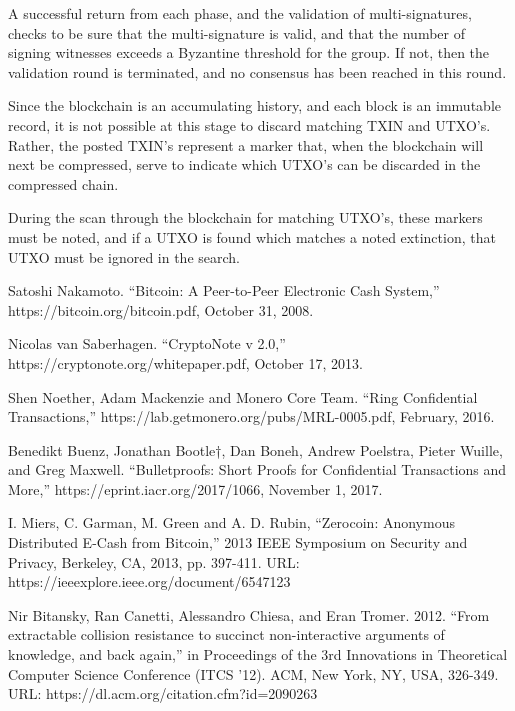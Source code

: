 \documentclass[a4paper, 10pt, conference]{ieeeconf}
\begin{document}
A successful return from each phase, and the validation of multi-signatures, checks to be sure that the multi-signature is valid, and that the number of signing witnesses exceeds a Byzantine threshold for the group. If not, then the validation round is terminated, and no consensus has been reached in this round.

Since the blockchain is an accumulating history, and each block is an immutable record, it is not possible at this stage to discard matching TXIN and UTXO's. Rather, the posted TXIN's represent a marker that, when the blockchain will next be compressed, serve to indicate which UTXO's can be discarded in the compressed chain.

During the scan through the blockchain for matching UTXO's, these markers must be noted, and if a UTXO is found which matches a noted extinction, that UTXO must be ignored in the search.

\begin{thebibliography}{99}

 Satoshi Nakamoto. ``Bitcoin: A Peer-to-Peer Electronic Cash System,'' https://bitcoin.org/bitcoin.pdf, October 31, 2008.

 Nicolas van Saberhagen. ``CryptoNote v 2.0,'' https://cryptonote.org/whitepaper.pdf, October 17, 2013.

 Shen Noether, Adam Mackenzie and Monero Core Team. ``Ring Confidential Transactions,'' https://lab.getmonero.org/pubs/MRL-0005.pdf, February, 2016.

 Benedikt Buenz, Jonathan Bootle†, Dan Boneh, Andrew Poelstra, Pieter Wuille, and Greg Maxwell. ``Bulletproofs: Short Proofs for Confidential Transactions and More,'' https://eprint.iacr.org/2017/1066, November 1, 2017. 

 I. Miers, C. Garman, M. Green and A. D. Rubin, ``Zerocoin: Anonymous Distributed E-Cash from Bitcoin,'' 2013 IEEE Symposium on Security and Privacy, Berkeley, CA, 2013, pp. 397-411. URL: https://ieeexplore.ieee.org/document/6547123

 Nir Bitansky, Ran Canetti, Alessandro Chiesa, and Eran Tromer. 2012. ``From extractable collision resistance to succinct non-interactive arguments of knowledge, and back again,'' in Proceedings of the 3rd Innovations in Theoretical Computer Science Conference (ITCS '12). ACM, New York, NY, USA, 326-349. URL: https://dl.acm.org/citation.cfm?id=2090263



\end{thebibliography}
\end{document}
